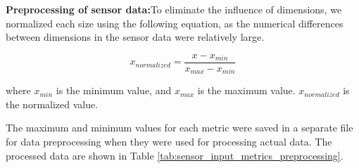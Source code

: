 \documentclass[acmsmall, screen]{acmart}
\begin{document}
\textbf{Preprocessing of sensor data:}To eliminate the influence of dimensions, we normalized each size using the following equation, as the numerical differences between dimensions in the sensor data were relatively large.



\begin{equation}
  x_{normalized} = \frac{x - x_{min}}{x_{max} - x_{min}}
\end{equation}

where \begin{math}
  x_{min}
\end{math} is the minimum value, and \begin{math}
  x_{max}
\end{math} is the maximum value. \begin{math}
  x_{normalized}
\end{math} is the normalized value.

The maximum and minimum values for each metric were saved in a separate file for data preprocessing when they were used for processing actual data. The processed data are shown in Table \ref{tab:sensor_input_metrics_preprocessing}.
\end{document}
